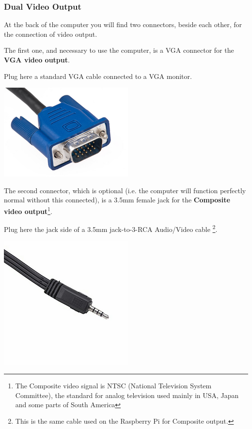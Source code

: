         \subsubsection{Dual Video Output}

        At the back of the computer you will find two connectors, beside each
        other, for the connection of video output.

        The first one, and necessary to use the computer, is a VGA connector for
        the \textbf{VGA video output}.
        
        Plug here a standard VGA cable connected to a VGA monitor.

        \centerline{\includegraphics[scale=0.5]{images/vgaconn.png}}

        The second connector, which is optional (i.e. the computer will function
        perfectly normal without this connected), is a 3.5mm female jack for the
        \textbf{Composite video output}\footnote{The Composite video signal is
        NTSC (National Television System Committee), the standard for analog
        television used mainly in USA, Japan and some parts of South America}.

        Plug here the jack side of a 3.5mm jack-to-3-RCA Audio/Video cable
        \footnote{This is the same cable used on the Raspberry Pi for Composite
        output.}.

        \centerline{\includegraphics[scale=0.5]{images/raspicable_jack.png}}

